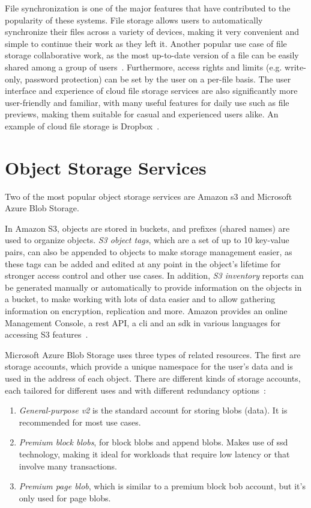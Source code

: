 File synchronization is one of the major features that have contributed to the popularity of these systems. File storage allows users to automatically synchronize their files across a variety of devices, making it very convenient and simple to continue their work as they left it. Another popular use case of file storage collaborative work, as the most up-to-date version of a file can be easily shared among a group of users~\cite{personal1}. Furthermore, access rights and limits (e.g. write-only, password protection) can be set by the user on a per-file basis. The user interface and experience of cloud file storage services are also significantly more user-friendly and familiar, with many useful features for daily use such as file previews, making them suitable for casual and experienced users alike. An example of cloud file storage is Dropbox~\cite{dropbox}.


\section{Object Storage Services}
Two of the most popular object storage services are Amazon \ac{s3} and Microsoft Azure Blob Storage.

In Amazon S3, objects are stored in buckets, and prefixes (shared names) are used to organize objects. \textit{S3 object tags}, which are a set of up to 10 key-value pairs, can also be appended to objects to make storage management easier, as these tags can be added and edited at any point in the object's lifetime for stronger access control and other use cases. In addition, \textit{S3 inventory} reports can be generated manually or automatically to provide information on the objects in a bucket, to make working with lots of data easier and to allow gathering information on encryption, replication and more. Amazon provides an online Management Console, a \ac{rest} API, a \ac{cli} and an \ac{sdk} in various languages for accessing S3 features~\cite{s3faq}.

Microsoft Azure Blob Storage uses three types of related resources. The first are storage accounts, which provide a unique namespace for the user's data and is used in the address of each object. There are different kinds of storage accounts, each tailored for different uses and with different redundancy options~\cite{blobaccounts}:

\begin{enumerate}

    \item \textit{General-purpose v2} is the standard account for storing blobs (data). It is recommended for most use cases.

    \item \textit{Premium block blobs}, for block blobs and append blobs. Makes use of \ac{ssd} technology, making it ideal for workloads that require low latency or that involve many transactions.

    \item \textit{Premium page blob}, which is similar to a premium block bob account, but it's only used for page blobs.

\end{enumerate}

